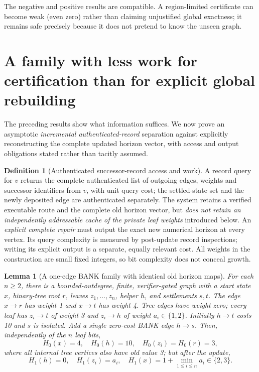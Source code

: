 \documentclass[11pt,letterpaper]{article}
\newtheorem{lemma}[theorem]{Lemma}
\theoremstyle{definition}
\newtheorem{definition}[theorem]{Definition}
\theoremstyle{remark}
\begin{document}
The negative and positive results are compatible. A region-limited certificate can become weak (even zero) rather than claiming unjustified global exactness; it remains safe precisely because it does not pretend to know the unseen graph.

\section{A family with less work for certification than for explicit global rebuilding}
The preceding results show what information suffices. We now prove an asymptotic \emph{incremental authenticated-record} separation against explicitly reconstructing the complete updated horizon vector, with access and output obligations stated rather than tacitly assumed.
\begin{definition}[Authenticated successor-record access and work]
A record query for \(v\) returns the complete authenticated list of outgoing edges, weights and successor identifiers from \(v\), with unit query cost; the settled-state set and the newly deposited edge are authenticated separately. The system retains a verified executable route and the complete old horizon vector, but \emph{does not retain an independently addressable cache of the private leaf weights} introduced below. An \emph{explicit complete repair} must output the exact new numerical horizon at every vertex. Its query complexity is measured by post-update record inspections; writing its explicit output is a separate, equally relevant cost. All weights in the construction are small fixed integers, so bit complexity does not conceal growth.
\end{definition}
\begin{lemma}[A one-edge BANK family with identical old horizon maps]\label{lem:bits}
For each \(n\ge2\), there is a bounded-outdegree, finite, verifier-gated graph with a start state \(x\), binary-tree root \(r\), leaves \(z_1,\ldots,z_n\), helper \(h\), and settlements \(s,t\). The edge \(x\to r\) has weight 1 and \(x\to t\) has weight 4. Tree edges have weight zero; every leaf has \(z_i\to t\) of weight 3 and \(z_i\to h\) of weight \(a_i\in\{1,2\}\). Initially \(h\to t\) costs 10 and \(s\) is isolated. Add a single zero-cost BANK edge \(h\to s\). Then, independently of the \(n\) leaf bits,
\[
H_0(x)=4,\quad H_0(h)=10,\quad H_0(z_i)=H_0(r)=3,
\]
where all internal tree vertices also have old value 3; but after the update,
\[
H_1(h)=0,\quad H_1(z_i)=a_i,\quad H_1(x)=1+\min_{1\le i\le n}a_i\in\{2,3\}.
\]
\end{lemma}
\end{document}
